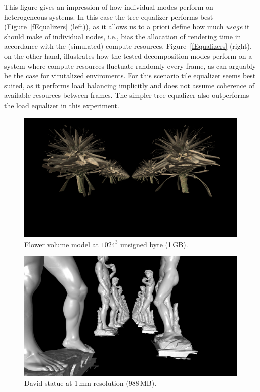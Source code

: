 \documentclass[10pt,journal,compsoc]{IEEEtran}
\newcommand{\fig}[1]{Figure~\ref{#1}}
\begin{document}
This figure gives an impression of how individual modes perform on heterogeneous
systems. In this case the tree equalizer performs best (\fig{fEqualizers}
(left)), as it allows us to a priori define how much {\em usage} it should make
of individual nodes, i.e., bias the allocation of rendering time in accordance
with the (simulated) compute resources. \fig{fEqualizers} (right), on the other
hand, illustrates how the tested decomposition modes perform on a system where
compute resources fluctuate randomly every frame, as can arguably be the case
for virutalized enviroments. For this scenario tile equalizer seems best suited,
as it performs load balancing implicitly and does not assume coherence of
available resources between frames. The simpler tree equalizer also outperforms
the load equalizer in this experiment.

\begin{figure}[ht]\center
  \includegraphics[width=.9\columnwidth]{images/benchmark_eVolve}
  \caption{\label{fBenchmarkEVolve} Flower volume model at $1024^3$ unsigned byte (1\,GB).}
\end{figure}

\begin{figure}[ht]\center
  \includegraphics[width=.9\columnwidth]{images/benchmark_eqPly2}
  \caption{\label{fBenchmarkEqPly} David statue at 1\,mm resolution (988\,MB).}
\end{figure}
\end{document}
